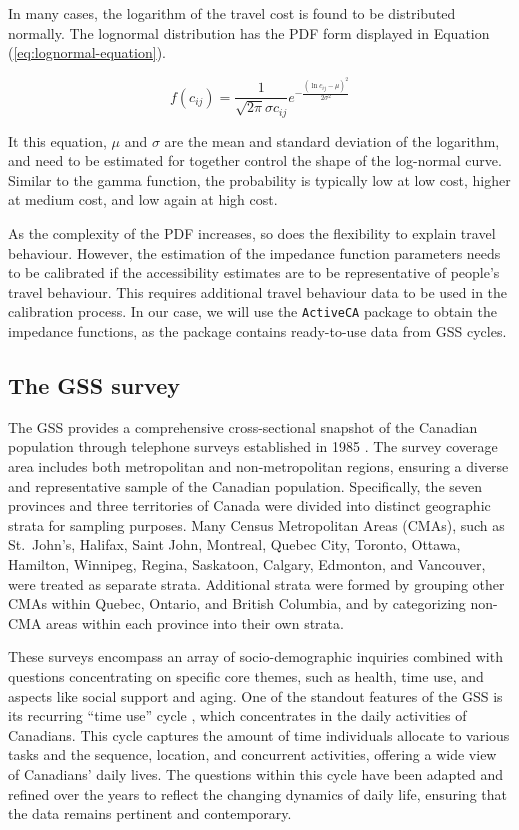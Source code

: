 \documentclass[preprint, 3p,
authoryear]{elsarticle} %
\begin{document}
In many cases, the logarithm of the travel cost is found to be
distributed normally. The lognormal distribution has the PDF form
displayed in Equation (\ref{eq:lognormal-equation}).

\begin{equation}
f(c_{ij}) = \frac{1}{\sqrt{2\pi} \sigma c_{ij}} e^{-\frac{(\ln c_{ij} - \mu)^2}{2\sigma^2}}
\label{eq:lognormal-equation}
\end{equation}

It this equation, \(\mu\) and \(\sigma\) are the mean and standard
deviation of the logarithm, and need to be estimated for together
control the shape of the log-normal curve. Similar to the gamma
function, the probability is typically low at low cost, higher at medium
cost, and low again at high cost.

As the complexity of the PDF increases, so does the flexibility to
explain travel behaviour. However, the estimation of the impedance
function parameters needs to be calibrated if the accessibility
estimates are to be representative of people's travel behaviour. This
requires additional travel behaviour data to be used in the calibration
process. In our case, we will use the \texttt{ActiveCA} package
\citep{dossantos2024ActiveCA} to obtain the impedance functions, as the
package contains ready-to-use data from GSS cycles.

\subsection{The GSS survey}\label{the-gss-survey}

The GSS provides a comprehensive cross-sectional snapshot of the
Canadian population through telephone surveys established in 1985
\citep{statisticscanada2022}. The survey coverage area includes both
metropolitan and non-metropolitan regions, ensuring a diverse and
representative sample of the Canadian population. Specifically, the
seven provinces and three territories of Canada were divided into
distinct geographic strata for sampling purposes. Many Census
Metropolitan Areas (CMAs), such as St.~John's, Halifax, Saint John,
Montreal, Quebec City, Toronto, Ottawa, Hamilton, Winnipeg, Regina,
Saskatoon, Calgary, Edmonton, and Vancouver, were treated as separate
strata. Additional strata were formed by grouping other CMAs within
Quebec, Ontario, and British Columbia, and by categorizing non-CMA areas
within each province into their own strata.

These surveys encompass an array of socio-demographic inquiries combined
with questions concentrating on specific core themes, such as health,
time use, and aspects like social support and aging. One of the standout
features of the GSS is its recurring ``time use'' cycle
\citep{statisticscanada2022}, which concentrates in the daily activities
of Canadians. This cycle captures the amount of time individuals
allocate to various tasks and the sequence, location, and concurrent
activities, offering a wide view of Canadians' daily lives. The
questions within this cycle have been adapted and refined over the years
to reflect the changing dynamics of daily life, ensuring that the data
remains pertinent and contemporary.
\end{document}
